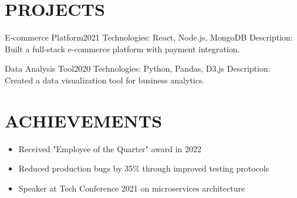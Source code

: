 \documentclass[10pt,a4paper]{article}
\begin{document}
\section{PROJECTS}
E-commerce Platform\hfill 2021
Technologies: React, Node.js, MongoDB
Description: Built a full-stack e-commerce platform with payment integration.

Data Analysis Tool\hfill 2020
Technologies: Python, Pandas, D3.js
Description: Created a data visualization tool for business analytics.

\section{ACHIEVEMENTS}
\begin{itemize}[noitemsep,topsep=0pt,leftmargin=*]
\item Received "Employee of the Quarter" award in 2022
\item Reduced production bugs by 35\% through improved testing protocols
\item Speaker at Tech Conference 2021 on microservices architecture
\end{itemize}
\end{document}
